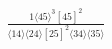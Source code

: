 \documentclass[varwidth, border=5pt]{standalone}
\begin{document}
\begin{my}
$\begin{gathered}
\scriptscriptstyle\frac{1⟨45⟩^3[45]^2}{⟨14⟩⟨24⟩[25]^2⟨34⟩⟨35⟩}
\end{gathered}$
\end{my}
\end{document}
